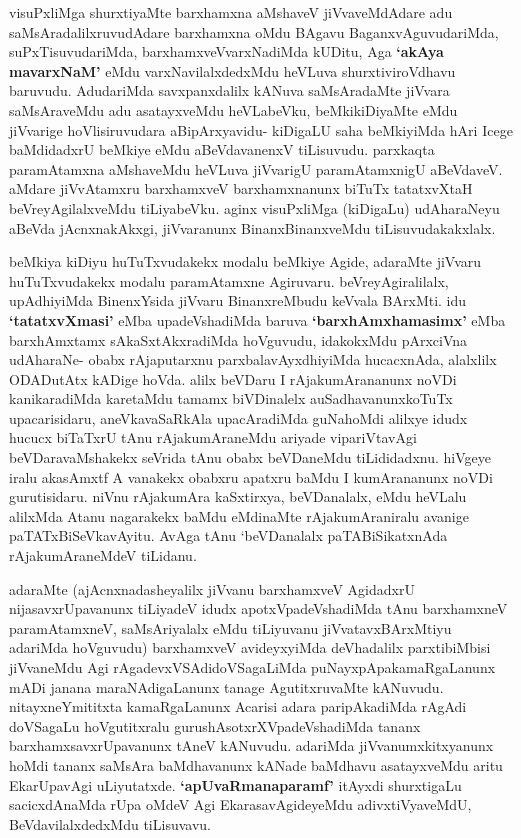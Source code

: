 \begin{artha}
visuPxliMga shurxtiyaMte barxhamxna aMshaveV jiVvaveMdAdare adu
saMsAradalilxruvudAdare barxhamxna oMdu BAgavu BaganxvAguvudariMda,
suPxTisuvudariMda, barxhamxveVvarxNadiMda kUDitu, Aga \textbf{`akAya
mavarxNaM'} eMdu varxNavilalxdedxMdu heVLuva shurxtiviroVdhavu
baruvudu. AdudariMda savxpanxdalilx kANuva saMsAradaMte jiVvara
saMsAraveMdu adu asatayxveMdu heVLabeVku, beMkikiDiyaMte eMdu
jiVvarige hoVlisiruvudara aBipArxyavidu- kiDigaLU saha beMkiyiMda
hAri Icege baMdidadxrU beMkiye eMdu aBeVdavanenxV tiLisuvudu. parxkaqta
paramAtamxna aMshaveMdu heVLuva jiVvarigU paramAtamxnigU
aBeVdaveV. aMdare jiVvAtamxru barxhamxveV barxhamxnanunx biTuTx
tatatxvXtaH beVreyAgilalxveMdu tiLiyabeVku. aginx visuPxliMga
(kiDigaLu) udAharaNeyu aBeVda jAcnxnakAkxgi, jiVvaranunx\break
BinanxBinanxveMdu tiLisuvudakakxlalx.
\end{artha}

\begin{artha}
beMkiya kiDiyu huTuTxvudakekx modalu beMkiye Agide, adaraMte jiVvaru
huTuTxvudakekx modalu paramAtamxne Agiruvaru. beVreyAgiralilalx,
upAdhiyiMda BinenxYsida jiVvaru BinanxreMbudu keVvala BArxMti. idu
\textbf{`tatatxvXmasi'} eMba upadeVshadiMda baruva \textbf{`barxhAmxhamasimx'} eMba
barxhAmxtamx sAkaSxtAkxradiMda hoVguvudu,  idakokxMdu pArxciVna
udAharaNe- obabx rAjaputarxnu parxbalavAyxdhiyiMda hucacxnAda,
alalxlilx ODADutAtx kADige hoVda. alilx beVDaru I rAjakumArananunx
noVDi kanikaradiMda karetaMdu tamamx biVDinalelx auSadhavanunxkoTuTx
upacarisidaru, aneVkavaSaRkAla upacAradiMda guNahoMdi alilxye idudx
hucucx biTaTxrU tAnu rAjakumAraneMdu ariyade vipariVtavAgi beVDaravaMshakekx seVrida tAnu obabx beVDaneMdu tiLididadxnu. hiVgeye iralu
akasAmxtf A vanakekx obabxru apatxru baMdu I kumArananunx noVDi
gurutisidaru. niVnu rAjakumAra  kaSxtirxya, beVDanalalx, eMdu
heVLalu alilxMda Atanu nagarakekx baMdu eMdinaMte rAjakumAraniralu
avanige paTATxBiSeVkavAyitu. AvAga tAnu `beVDanalalx paTABiSikatxnAda
rAjakumAraneMdeV tiLidanu.
\end{artha}

\begin{artha}
adaraMte (ajAcnxnadasheyalilx jiVvanu barxhamxveV AgidadxrU
nijasavxrUpavanunx tiLiyadeV idudx apotxVpadeVshadiMda tAnu
barxhamxneV paramAtamxneV, saMsAriyalalx eMdu tiLiyuvanu jiVvatavxBArxMtiyu
adariMda hoVguvudu) barxhamxveV avideyxyiMda deVhadalilx parxtibiMbisi
jiVvaneMdu Agi rAgadevxVSAdidoVSagaLiMda puNayxpApakamaRgaLanunx mADi
janana maraNAdigaLanunx tanage AgutitxruvaMte
kANuvudu. nitayxneYmititxta kamaRgaLanunx Acarisi adara paripAkadiMda
rAgAdi doVSagaLu hoVgutitxralu gurushAsotxrXVpadeVshadiMda tananx
barxhamxsavxrUpavanunx tAneV kANuvudu. adariMda jiVvanumxkitxyanunx
hoMdi tananx saMsAra baMdhavanunx kANade baMdhavu asatayxveMdu aritu
EkarUpavAgi uLiyutatxde. \textbf{`apUvaRmanaparamf'} itAyxdi
shurxtigaLu sacicxdAnaMda rUpa oMdeV Agi EkarasavAgideyeMdu
adivxtiVyaveMdU, BeVdavilalxdedxMdu tiLisuvavu.
\end{artha}


